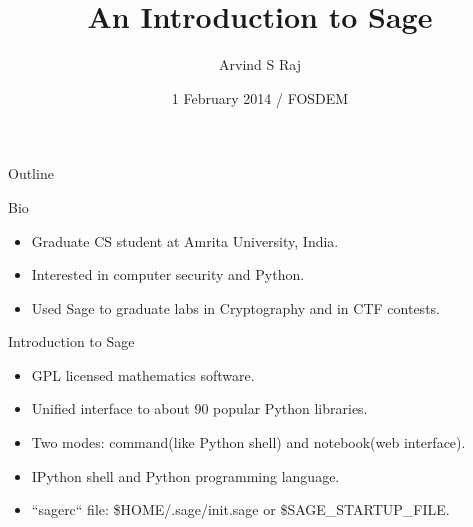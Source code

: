 \documentclass{beamer}
\title{An Introduction to Sage}
\author[Arvind]
{Arvind S Raj}
\institute[Amrita]
{
  Department of Cybersecurity Systems and Networks\\
  Amrita University, India
}
\date[FOSDEM 2014]
{1 February 2014 / FOSDEM}
\begin{document}
\begin{frame}
  \titlepage
\end{frame}

\begin{frame}{Outline}
  \tableofcontents
\end{frame}

\begin{frame}{Bio}
  \begin{itemize}
    \item Graduate CS student at Amrita University, India.
    \item Interested in computer security and Python.
    \item Used Sage to graduate labs in Cryptography and in CTF contests.
  \end{itemize}
\end{frame}

\begin{frame}{Introduction to Sage}
  \begin{itemize}
   \item GPL licensed mathematics software.
   \item Unified interface to about 90 popular Python libraries.
   \item Two modes: command(like Python shell) and notebook(web interface).
   \item IPython shell and Python programming language.
   \item ``sagerc`` file: \$HOME/.sage/init.sage or \$SAGE\_STARTUP\_FILE.
  \end{itemize}
\end{frame}
\end{document}
